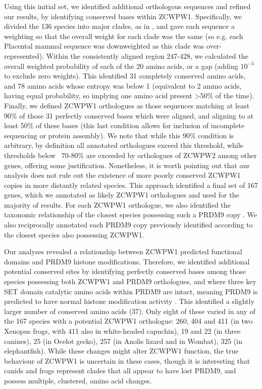 Using this initial set, we identified additional orthologous sequences and refined our results, by identifying conserved bases within ZCWPW1.
Specifically, we divided the 136 species into major clades, as in \parencite{Baker2017Repeated}, and gave each sequence a weighting so that the overall weight for each clade was the same (so e.g. each Placental mammal sequence was downweighted as this clade was over-represented).
Within the consistently aligned region 247-428, we calculated the overall weighted probability of each of the 20 amino acids, or a gap (adding $10^{-5}$ to exclude zero weights).
This identified 31 completely conserved amino acids, and 78 amino acids whose entropy was below 1 (equivalent to 2 amino acids, having equal probability, so implying one amino acid present >50\% of the time).
Finally, we defined ZCWPW1 orthologues as those sequences matching at least 90\% of those 31 perfectly conserved bases which were aligned, and aligning to at least 50\% of these bases (this last condition allows for inclusion of incomplete sequencing or protein assembly).
We note that while this 90\% condition is arbitrary, by definition all annotated orthologues exceed this threshold, while thresholds below ~70-80\% are exceeded by orthologues of ZCWPW2 among other genes, offering some justification.
Nonetheless, it is worth pointing out that our analysis does not rule out the existence of more poorly conserved ZCWPW1 copies in more distantly related species.
This approach identified a final set of 167 genes, which we annotated as likely ZCWPW1 orthologues and used for the majority of results.
For each ZCWPW1 orthologue, we also identified the taxonomic relationship of the closest species possessing such a PRDM9 copy \iffalse(Supplementary Table 1)\fi.
We also reciprocally annotated each PRDM9 copy previously identified \parencite{Baker2017Repeated} according to the closest species also possessing ZCWPW1\iffalse(Supplementary Table 1)\fi.

Our analyses revealed a relationship between ZCWPW1 predicted functional domains and PRDM9 histone modifications.
Therefore, we identified additional potential conserved sites by identifying perfectly conserved bases among those species possessing both ZCWPW1 and PRDM9 orthologues, and where three key SET domain catalytic amino acids within PRDM9 are intact, meaning PRDM9 is predicted to have normal histone modification activity \parencite{Baker2017Repeated}.
This identified a slightly larger number of conserved amino acids (37).
Only eight of these varied in any of the 167 species with a potential ZCWPW1 orthologue: 260, 404 and 411 (in two Xenopus frogs, with 411 also in white-headed capuchin), 19 and 22 (in three canines), 25 (in Ocelot gecko), 257 (in Anolis lizard and in Wombat), 325 (in elephantfish).
While these changes might alter ZCWPW1 function, the true behaviour of ZCWPW1 is uncertain in these cases, though it is interesting that canids and frogs represent clades that all appear to have lost PRDM9, and possess multiple, clustered, amino acid changes.

